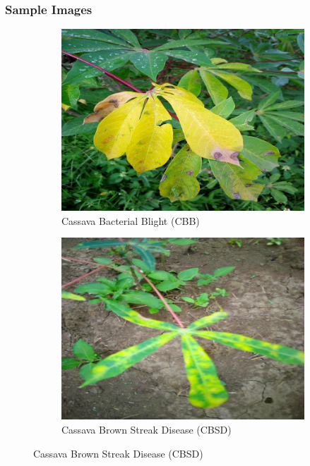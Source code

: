 \documentclass[a4paper,12pt]{article}
\begin{document}
\subsubsection*{Sample Images}
\begin{figure}[H]
    \centering
    \begin{subfigure}{0.45\textwidth}
        \centering
        \includegraphics[width=\textwidth]{assets/class_images/class_0.jpg}
        \caption{Cassava Bacterial Blight (CBB)}
    \end{subfigure}\hfill
    \begin{subfigure}{0.45\textwidth}
        \centering
        \includegraphics[width=\textwidth]{assets/class_images/class_1.jpg}
        \caption{Cassava Brown Streak Disease (CBSD)}
    \end{subfigure}
    

\end{figure}
\end{document}
